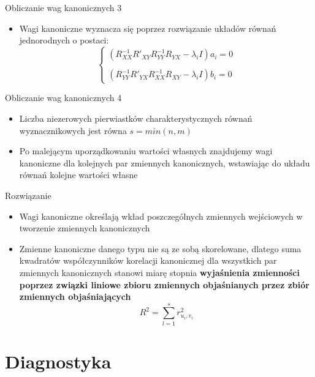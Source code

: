 \documentclass{beamer}
\begin{document}
\begin{frame}{Obliczanie wag kanonicznych 3}
  \begin{itemize}
  \item Wagi kanoniczne wyznacza się poprzez rozwiązanie układów równań jednorodnych o postaci:
    $$
    \left\{
    \begin{array}{ccc}
      (R^{-1}_{XX}R'_{XY}R^{-1}_{YY}R_{YX} - \lambda_iI)a_i = 0 \\
      \\
      (R^{-1}_{YY}R'_{YX}R^{-1}_{XX}R_{XY} - \lambda_iI)b_i = 0
    \end{array}
    $$
    
  \end{itemize}
\end{frame}

\begin{frame}{Obliczanie wag kanonicznych 4}
  \begin{itemize}
  \item Liczba niezerowych pierwiastków charakterystycznych równań wyznacznikowych jest równa $s = min(n, m)$
  \item Po malejącym uporządkowaniu wartości własnych znajdujemy wagi kanoniczne dla kolejnych par zmiennych kanonicznych, wstawiając do układu równań kolejne wartości własne
  \end{itemize}
\end{frame}

\begin{frame}{Rozwiązanie}
  \begin{itemize}
  \item  Wagi kanoniczne określają wkład poszczególnych zmiennych wejściowych w tworzenie zmiennych kanonicznych 
  \item Zmienne kanoniczne danego typu nie są ze sobą skorelowane, dlatego suma kwadratów współczynników korelacji
kanonicznej dla wszystkich par zmiennych kanonicznych stanowi miarę stopnia \textbf{wyjaśnienia zmienności poprzez
  związki liniowe zbioru zmiennych objaśnianych przez zbiór zmiennych objaśniających}
$$R^2 = \sum_{l=1}^{s}r^2_{u_i,v_i}$$
  \end{itemize}
\end{frame}

\section{Diagnostyka}
\end{document}
